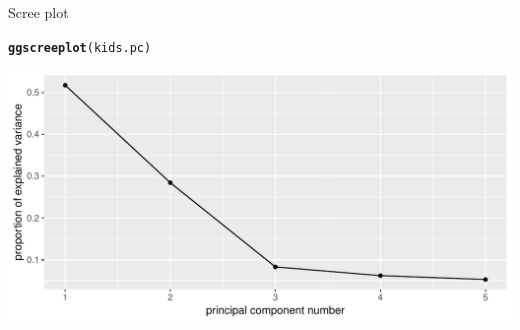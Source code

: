 \documentclass[unknownkeysallowed]{beamer}\usepackage[]{graphicx}\usepackage[]{color}
\makeatletter
\def\maxwidth{ %
  \ifdim\Gin@nat@width>\linewidth
    \linewidth
  \else
    \Gin@nat@width
  \fi
}
\newcommand{\hlstd}[1]{\textcolor[rgb]{0.345,0.345,0.345}{#1}}%
\newcommand{\hlkwd}[1]{\textcolor[rgb]{0.737,0.353,0.396}{\textbf{#1}}}%
\newenvironment{kframe}{%
 \def\at@end@of@kframe{}%
 \ifinner\ifhmode%
  \def\at@end@of@kframe{\end{minipage}}%
  \begin{minipage}{\columnwidth}%
 \fi\fi%
 \def\FrameCommand##1{\hskip\@totalleftmargin \hskip-\fboxsep
 \colorbox{shadecolor}{##1}\hskip-\fboxsep
     \hskip-\linewidth \hskip-\@totalleftmargin \hskip\columnwidth}%
 \MakeFramed {\advance\hsize-\width
   \@totalleftmargin\z@ \linewidth\hsize
   \@setminipage}}%
 {\par\unskip\endMakeFramed%
 \at@end@of@kframe}
\newenvironment{knitrout}{}{} %
\makeatother
\begin{document}
\begin{frame}[fragile]{Scree plot}
   
\begin{knitrout}
\color{fgcolor}\begin{kframe}
\begin{alltt}
\hlkwd{ggscreeplot}\hlstd{(kids.pc)}
\end{alltt}
\end{kframe}
\includegraphics[width=\maxwidth]{figure/unnamed-chunk-470-1} 

\end{knitrout}
  
  
\end{frame}
\end{document}
